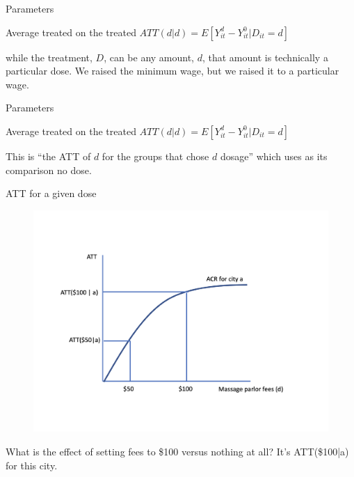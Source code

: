 \documentclass{beamer}
\begin{document}
\begin{frame}{Parameters}

\begin{block}{Average treated on the treated}
$ATT(d|d) = E[Y^d_{it} - Y^0_{it} | D_{it}=d]$
\end{block}

\bigskip

while the treatment, $D$, can be any amount, $d$, that amount is technically a particular dose.  We raised the minimum wage, but we raised it to a particular wage. 

\end{frame}


\begin{frame}{Parameters}

\begin{block}{Average treated on the treated}
$ATT(d|d) = E[Y^d_{it} - Y^0_{it} | D_{it}=d]$
\end{block}

\bigskip

This is ``the ATT of $d$ for the groups that chose $d$ dosage'' which uses as its comparison no dose.

\end{frame}

\begin{frame}{ATT for a given dose}

\begin{figure}
\begin{center}
             \includegraphics[scale=0.3]{./lecture_includes/acrt_fig1.png}
\end{center}
\end{figure}

What is the effect of setting fees to \$100 versus nothing at all? It's ATT(\$100|a) for this city.


\end{frame}
\end{document}
